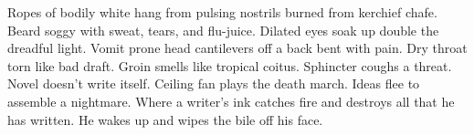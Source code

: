 \documentclass{article}
\begin{document}
\newline

Ropes of bodily white hang from pulsing nostrils burned from kerchief
chafe. Beard soggy with sweat, tears, and flu-juice. Dilated eyes soak
up double the dreadful light. Vomit prone head cantilevers off a back
bent with pain. Dry throat torn like bad draft. Groin smells like
tropical coitus. Sphincter coughs a threat. Novel doesn't write itself.
Ceiling fan plays the death march. Ideas flee to assemble a nightmare.
Where a writer's ink catches fire and destroys all that he has written.
He wakes up and wipes the bile off his face.
\end{document}

